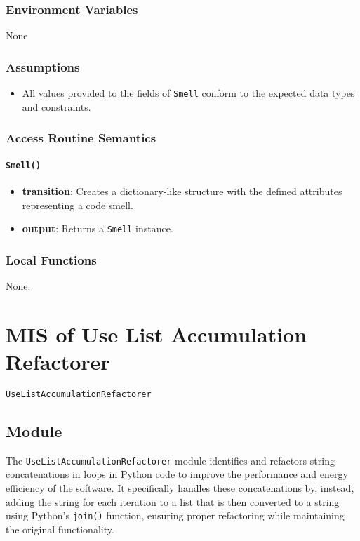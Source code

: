 \documentclass[12pt, titlepage]{article}
\begin{document}
\subsubsection{Environment Variables}
None

\subsubsection{Assumptions}
\begin{itemize}
  \item All values provided to the fields of \texttt{Smell} conform to the expected data types and constraints.
\end{itemize}

\subsubsection{Access Routine Semantics}

\paragraph{\texttt{Smell()}}
\begin{itemize}
  \item \textbf{transition}: Creates a dictionary-like structure with the defined attributes representing a code smell.
  \item \textbf{output}: Returns a \texttt{Smell} instance.
\end{itemize}

\subsubsection{Local Functions}
None.
  

\newpage

\section{MIS of Use List Accumulation Refactorer} \label{mis:ListAccum}

\texttt{UseListAccumulationRefactorer}

\subsection{Module}

The \texttt{UseListAccumulationRefactorer} module identifies and refactors 
string concatenations in loops in Python code to improve the performance and energy efficiency of the software. It specifically handles these concatenations by, instead, adding the string for each iteration to a list that is then converted to a string using Python's \texttt{join()} function, ensuring proper refactoring while maintaining the original functionality.
\end{document}
